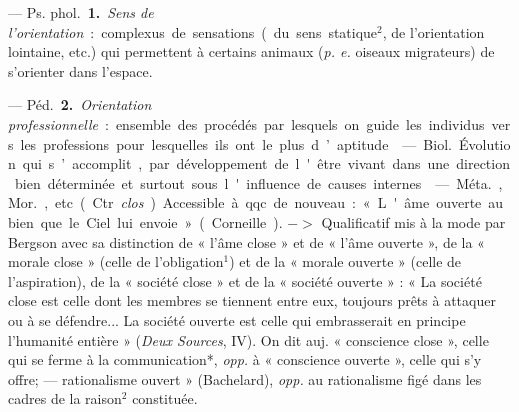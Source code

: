 \begin{itemize}[leftmargin=1cm, label=, itemsep=1pt]
 — \si{Ps. phol.} {\bf 1.} {\it Sens de l'orientation} :
complexus de sensations (du sens statique$^2$, de l’orientation lointaine,
etc.) qui permettent à certains animaux ({\it p. e.} oiseaux migrateurs) de
s'orienter dans l’espace.

— \si{Péd.} {\bf 2.} {\it Orientation professionnelle} : ensemble des
procédés par lesquels on guide les individus vers les professions pour
lesquelles ils ont le plus d’aptitude.

 — \si{Biol.} Évolution qui s’accomplit, par développement de
l'être vivant dans une direction bien déterminée et surtout sous l'influence
de causes internes.

 — \si{Méta.}, \si{Mor.}, etc. (Ctr. {\it clos}). Accessible à qqc. de
nouveau : « L'âme ouverte au bien que le Ciel lui envoie » (Corneille). $->$
Qualificatif mis à la mode par Bergson avec sa distinction de « l’âme close »
et de « l'âme ouverte », de la « morale close » (celle de l'obligation$^1$)
et de la « morale ouverte » (celle de l’aspiration), de la « société close »
et de la « société ouverte » : « La société close est celle dont les membres
se tiennent entre eux, toujours prêts à attaquer ou à se défendre... La
société ouverte est celle qui embrasserait en principe l'humanité entière
» ({\it Deux Sources}, IV). On dit auj. « conscience close », celle qui se
ferme à la communication*, {\it opp.} à « conscience ouverte », celle qui s’y
offre; — rationalisme ouvert » (Bachelard), {\it opp.} au rationalisme figé
dans les cadres de la raison$^2$ constituée.

	\end{itemize}
